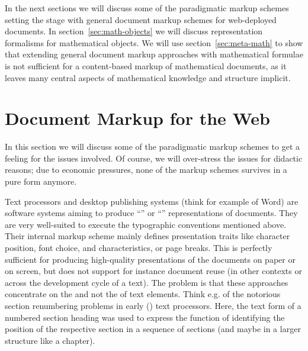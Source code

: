 In the next sections we will discuss some of the paradigmatic markup schemes
setting the stage with general document markup schemes for web-deployed documents.
In section~\ref{sec:math-objects} we will discuss representation formalisms for
mathematical objects. We will use section~\ref{sec:meta-math} to show that
extending general document markup approaches with mathematical formulae is not
sufficient for a content-based markup of mathematical documents, as it leaves many
central aspects of mathematical knowledge and structure implicit.

\section{Document Markup for the Web}\label{sec:markup-web}

In this section we will discuss some of the paradigmatic markup schemes to get a
feeling for the issues involved. Of course, we will over-stress the issues for
didactic reasons; due to economic pressures, none of the markup schemes survives
in a pure form anymore.

Text processors and desktop publishing systems (think for example of
{} Word) are software systems aiming to
produce ``{}'' or ``{}'' representations
of documents.  They are very well-suited to execute the typographic conventions
mentioned above. Their internal markup scheme mainly defines presentation traits
like character position, font choice, and characteristics, or page breaks. This is
perfectly sufficient for producing high-quality presentations of the documents on
paper or on screen, but does not support for instance document reuse (in other
contexts or across the development cycle of a text). The problem is that these
approaches concentrate on the {} and not the {} of text
elements.  Think e.g. of the notorious section renumbering problems in early
({}) text processors. Here, the text form of a numbered section
heading was used to express the function of identifying the position of the
respective section in a sequence of sections (and maybe in a larger structure like
a chapter).

